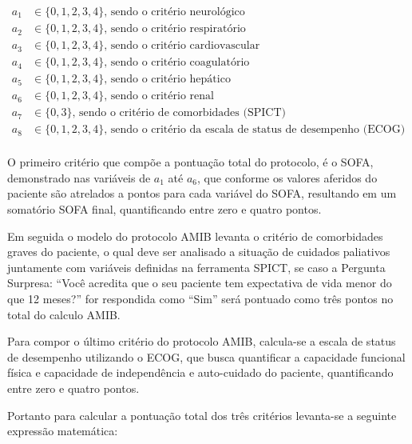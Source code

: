 \documentclass[12pt]{article}
\begin{document}
\[
    \begin{split}
        a_1 &\in \{0, 1, 2, 3, 4\}\text{, sendo o critério neurológico} \\
        a_2 &\in \{0, 1, 2, 3, 4\}\text{, sendo o critério respiratório} \\
        a_3 &\in \{0, 1, 2, 3, 4\}\text{, sendo o critério cardiovascular} \\
        a_4 &\in \{0, 1, 2, 3, 4\}\text{, sendo o critério coagulatório} \\
        a_5 &\in \{0, 1, 2, 3, 4\}\text{, sendo o critério hepático} \\
        a_6 &\in \{0, 1, 2, 3, 4\}\text{, sendo o critério renal} \\
        a_7 &\in \{0, 3\}\text{, sendo o critério de comorbidades (SPICT) } \\
        a_8 &\in \{0, 1, 2, 3, 4\}\text{, sendo o critério da escala de status de desempenho (ECOG)} \\
    \end{split}
\] 

O primeiro critério que compõe a pontuação total do protocolo, é o SOFA, demonstrado nas variáveis de $a_1$ até $a_6$, que conforme os valores aferidos do paciente são atrelados a pontos para cada variável do SOFA, resultando em um somatório SOFA final, quantificando entre zero e quatro pontos.

Em seguida o modelo do protocolo AMIB levanta o critério de comorbidades graves do paciente, o qual deve ser analisado a situação de cuidados paliativos juntamente com variáveis definidas na ferramenta SPICT, se caso a Pergunta Surpresa: “Você acredita que o seu paciente tem expectativa de vida menor do que 12 meses?” for respondida como “Sim” será pontuado como três pontos no total do calculo AMIB.

Para compor o último critério do protocolo AMIB, calcula-se a escala de status de desempenho utilizando o ECOG, que busca quantificar a capacidade funcional física e capacidade de independência e auto-cuidado do paciente, quantificando entre zero e quatro pontos.

Portanto para calcular a pontuação total dos três critérios levanta-se a seguinte expressão matemática:
\end{document}
